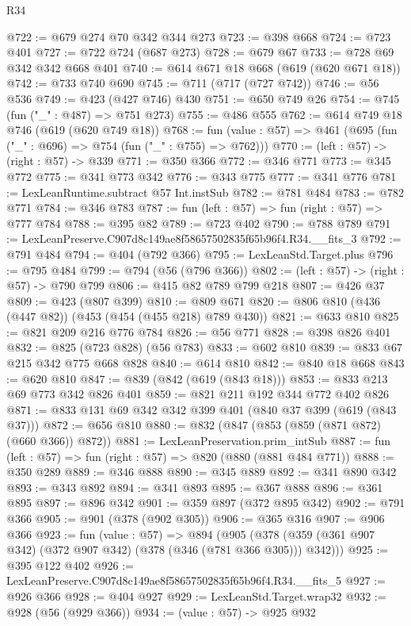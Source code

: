 \begin{lexlean}{R34}
\begin{coremodule}
@722 := @679 @274 @70 @342 @344 @273
@723 := @398 @668
@724 := @723 @401
@727 := @722 @724 (@687 @273)
@728 := @679 @67
@733 := @728 @69 @342 @342 @668 @401
@740 := @614 @671 @18 @668 (@619 (@620 @671 @18))
@742 := @733 @740 @690
@745 := @711 (@717 (@727 @742))
@746 := @56 @536
@749 := @423 (@427 @746) @430
@751 := @650 @749 @26
@754 := @745 (fun ("_" : @487) => @751 @273)
@755 := @486 @555
@762 := @614 @749 @18 @746 (@619 (@620 @749 @18))
@768 := fun (value : @57) => @461 (@695 (fun ("_" : @696) => @754 (fun ("_" : @755) => @762)))
@770 := (left : @57) -> (right : @57) -> @339
@771 := @350 @366
@772 := @346 @771
@773 := @345 @772
@775 := @341 @773 @342
@776 := @343 @775
@777 := @341 @776
@781 := LexLeanRuntime.subtract @57 Int.instSub
@782 := @781 @484
@783 := @782 @771
@784 := @346 @783
@787 := fun (left : @57) => fun (right : @57) => @777 @784
@788 := @395 @82
@789 := @723 @402
@790 := @788 @789
@791 := LexLeanPreserve.C907d8c149ae8f58657502835f65b96f4.R34.__fits_3
@792 := @791 @484
@794 := @404 (@792 @366)
@795 := LexLeanStd.Target.plus
@796 := @795 @484
@799 := @794 (@56 (@796 @366))
@802 := (left : @57) -> (right : @57) -> @790 @799
@806 := @415 @82 @789 @799 @218
@807 := @426 @37
@809 := @423 (@807 @399)
@810 := @809 @671
@820 := @806 @810 (@436 (@447 @82)) (@453 (@454 (@455 @218) @789 @430))
@821 := @633 @810
@825 := @821 @209 @216 @776 @784
@826 := @56 @771
@828 := @398 @826 @401
@832 := @825 (@723 @828) (@56 @783)
@833 := @602 @810
@839 := @833 @67 @215 @342 @775 @668 @828
@840 := @614 @810
@842 := @840 @18 @668
@843 := @620 @810
@847 := @839 (@842 (@619 (@843 @18)))
@853 := @833 @213 @69 @773 @342 @826 @401
@859 := @821 @211 @192 @344 @772 @402 @826
@871 := @833 @131 @69 @342 @342 @399 @401 (@840 @37 @399 (@619 (@843 @37)))
@872 := @656 @810
@880 := @832 (@847 (@853 (@859 (@871 @872) (@660 @366)) @872))
@881 := LexLeanPreservation.prim_intSub
@887 := fun (left : @57) => fun (right : @57) => @820 (@880 (@881 @484 @771))
@888 := @350 @289
@889 := @346 @888
@890 := @345 @889
@892 := @341 @890 @342
@893 := @343 @892
@894 := @341 @893
@895 := @367 @888
@896 := @361 @895
@897 := @896 @342
@901 := @359 @897 (@372 @895 @342)
@902 := @791 @366
@905 := @901 (@378 (@902 @305))
@906 := @365 @316
@907 := @906 @366
@923 := fun (value : @57) =>
  @894 (@905 (@378 (@359 (@361 @907 @342) (@372 @907 @342) (@378 (@346 (@781 @366 @305))) @342)))
@925 := @395 @122 @402
@926 := LexLeanPreserve.C907d8c149ae8f58657502835f65b96f4.R34.__fits_5
@927 := @926 @366
@928 := @404 @927
@929 := LexLeanStd.Target.wrap32
@932 := @928 (@56 (@929 @366))
@934 := (value : @57) -> @925 @932

\end{coremodule}
\end{lexlean}
